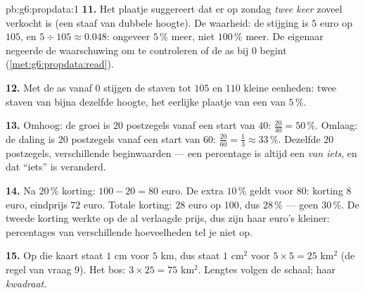 \begin{solution}{pb:g6:propdata:1}
\textbf{11.} Het plaatje suggereert dat er op zondag \emph{twee keer} zoveel
verkocht is (een staaf van dubbele hoogte). De waarheid: de stijging is $5$ euro
op $105$, en $5 \div 105 \approx 0.048$: ongeveer $5\,\%$ meer, niet $100\,\%$
meer. De eigenaar negeerde de waarschuwing om te controleren of de as bij $0$
begint (\cref{met:g6:propdata:read}).

\textbf{12.} Met de as vanaf $0$ stijgen de staven tot $105$ en $110$ kleine
eenheden: twee staven van bijna dezelfde hoogte, het eerlijke plaatje van een
 van $5\,\%$.

\textbf{13.} Omhoog: de groei is $20$ postzegels vanaf een start van $40$:
$\frac{20}{40} = 50\,\%$. Omlaag: de daling is $20$ postzegels vanaf een start
van $60$: $\frac{20}{60} = \frac13 \approx 33\,\%$. Dezelfde $20$ postzegels,
verschillende beginwaarden --- een percentage is altijd een  \emph{van
iets}, en dat ``iets'' is veranderd.

\textbf{14.} Na $20\,\%$ korting: $100 - 20 = 80$ euro. De extra $10\,\%$ geldt
voor $80$: korting $8$ euro, eindprijs $72$ euro. Totale korting: $28$ euro op
$100$, dus $28\,\%$ --- geen $30\,\%$. De tweede korting werkte op de al
verlaagde prijs, dus zijn haar euro's kleiner: percentages van verschillende
hoeveelheden tel je niet op.

\textbf{15.} Op die kaart staat $1$ cm voor $5$ km, dus staat $1$ cm$^2$ voor
$5 \times 5 = 25$ km$^2$ (de regel van vraag 9). Het bos:
$3 \times 25 = 75$ km$^2$. Lengtes volgen de schaal;  haar
\emph{kwadraat}.
\end{solution}
